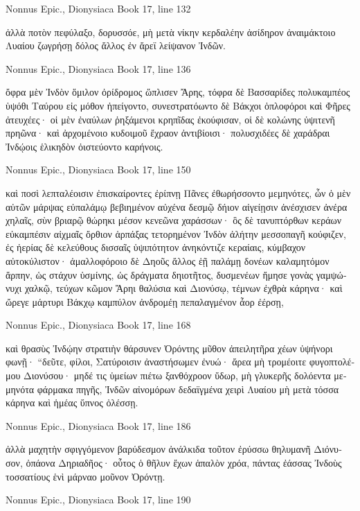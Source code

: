 \documentclass[12pt,letterpaper,twoside,final]{memoir}
\begin{document}
\begin{greek}
Nonnus Epic., Dionysiaca 
Book 17, line 132

ἀλλὰ ποτὸν πεφύλαξο, δορυσσόε, μὴ μετὰ νίκην 
κερδαλέην ἀσίδηρον ἀναιμάκτοιο Λυαίου 
ζωγρήσῃ δόλος ἄλλος ἐν ἄρεϊ λείψανον Ἰνδῶν. 



Nonnus Epic., Dionysiaca 
Book 17, line 136

ὄφρα μὲν Ἰνδὸν ὅμιλον ὀρίδρομος ὥπλισεν Ἄρης, 
τόφρα δὲ Βασσαρίδες πολυκαμπέος ὑψόθι Ταύρου 
εἰς μόθον ἠπείγοντο, συνεστρατόωντο δὲ Βάκχοι 
ὁπλοφόροι καὶ Φῆρες ἀτευχέες· οἱ μὲν ἐναύλων   
ῥηξάμενοι κρηπῖδας ἐκούφισαν, οἱ δὲ κολώνης 
ὑψιτενῆ πρηῶνα· καὶ ἀρχομένοιο κυδοιμοῦ 
ἔχραον ἀντιβίοισι· πολυσχιδέες δὲ χαράδραι 
Ἰνδῴοις ἑλικηδὸν ὀιστεύοντο καρήνοις. 



Nonnus Epic., Dionysiaca 
Book 17, line 150

καὶ ποσὶ λεπταλέοισιν ἐπισκαίροντες ἐρίπνῃ 
Πᾶνες ἐθωρήσσοντο μεμηνότες, ὧν ὁ μὲν αὐτῶν 
μάρψας εὐπαλάμῳ βεβιημένον αὐχένα δεσμῷ 
δήιον αἰγείῃσιν ἀνέσχισεν ἀνέρα χηλαῖς, 
σὺν βριαρῷ θώρηκι μέσον κενεῶνα χαράσσων· 
ὃς δὲ τανυπτόρθων κεράων εὐκαμπέσιν αἰχμαῖς 
ὄρθιον ἁρπάξας τετορημένον Ἰνδὸν ἀλήτην 
μεσσοπαγῆ κούφιζεν, ἐς ἠερίας δὲ κελεύθους 
δισσαῖς ὑψιπότητον ἀνηκόντιζε κεραίαις, 
κύμβαχον αὐτοκύλιστον· ἀμαλλοφόροιο δὲ Δηοῦς 
ἄλλος ἑῇ παλάμῃ δονέων καλαμητόμον ἅρπην, 
ὡς στάχυν ὑσμίνης, ὡς δράγματα δηιοτῆτος, 
δυσμενέων ἤμησε γονὰς γαμψώνυχι χαλκῷ, 
τεύχων κῶμον Ἄρηι θαλύσια καὶ Διονύσῳ, 
τέμνων ἐχθρὰ κάρηνα· καὶ ὤρεγε μάρτυρι Βάκχῳ 
καμπύλον ἀνδρομέῃ πεπαλαγμένον ἆορ ἐέρσῃ, 




Nonnus Epic., Dionysiaca 
Book 17, line 168

καὶ θρασὺς Ἰνδῴην στρατιὴν θάρσυνεν Ὀρόντης 
μῦθον ἀπειλητῆρα χέων ὑψήνορι φωνῇ· 
 “δεῦτε, φίλοι, Σατύροισιν ἀναστήσωμεν ἐνυώ· 
ἄρεα μὴ τρομέοιτε φυγοπτολέμου Διονύσου· 
μηδέ τις ὑμείων πιέτω ξανθόχροον ὕδωρ, 
μὴ γλυκερῆς δολόεντα μεμηνότα φάρμακα πηγῆς, 
Ἰνδῶν αἰνομόρων δεδαϊγμένα χειρὶ Λυαίου 
μὴ μετὰ τόσσα κάρηνα καὶ ἡμέας ὕπνος ὀλέσσῃ. 



Nonnus Epic., Dionysiaca 
Book 17, line 186

                                    ἀλλὰ μαχητὴν 
σφιγγόμενον βαρύδεσμον ἀνάλκιδα τοῦτον ἐρύσσω 
θηλυμανῆ Διόνυσον, ὀπάονα Δηριαδῆος·   
οὗτος ὁ θῆλυν ἔχων ἁπαλὸν χρόα, πάντας ἐάσσας 
Ἰνδοὺς τοσσατίους ἑνὶ μάρναο μοῦνον Ὀρόντῃ. 



Nonnus Epic., Dionysiaca 
Book 17, line 190


\end{greek}
\end{document}
